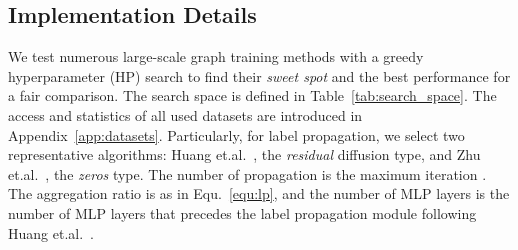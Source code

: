 \message{ !name(main.tex)}\documentclass{article}
\begin{document}
\subsection{Implementation Details}
\vspace{-1mm}
We test numerous large-scale graph training methods with a greedy hyperparameter (HP) search to find their \textit{sweet spot} and the best performance for a fair comparison. The search space is defined in Table~\ref{tab:search_space}. The access and statistics of all used datasets are introduced in Appendix~\ref{app:datasets}. Particularly, for label propagation, we select two representative algorithms: Huang et.al.~\citep{huang2020combining}, the \textit{residual} diffusion type, and Zhu et.al.~\citep{zhu2005semi}, the \textit{zeros} type. The number of propagation is the maximum iteration . The aggregation ratio is  as in Equ.~\eqref{equ:lp}, and the number of MLP layers is the number of MLP layers that precedes the label propagation module following Huang et.al.~\citep{huang2020combining}.
\end{document}

